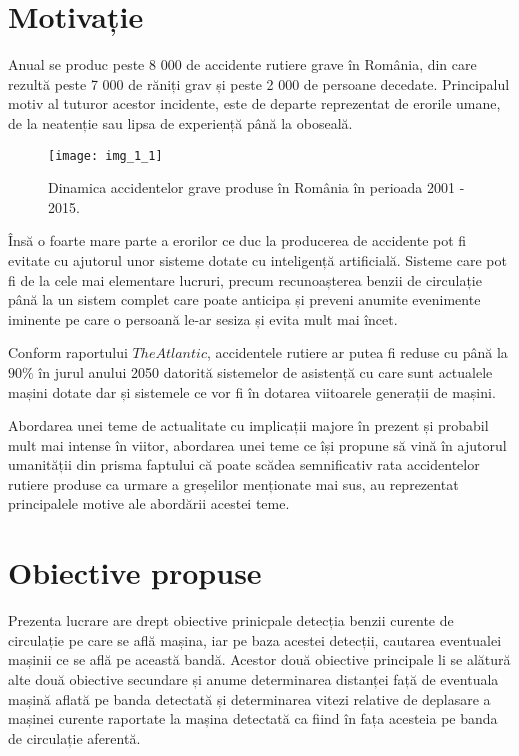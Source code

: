 \section{Motivație}

Anual se produc peste 8 000 de accidente rutiere grave în România, din care rezultă peste 7 000 de răniți grav și peste 2 000 de persoane decedate. Principalul motiv al tuturor acestor incidente, este de departe reprezentat de erorile umane, de la neatenție sau lipsa de experiență până la oboseală.
\begin{figure}[!h]
	\centering
	\texttt{[image: img\_1\_1]}
	\caption{Dinamica accidentelor grave produse în România în perioada 2001 - 2015.}
\end{figure} 

Însă o foarte mare parte a erorilor ce duc la producerea de accidente pot fi evitate cu ajutorul unor sisteme dotate cu inteligență artificială. Sisteme care pot fi de la cele mai elementare lucruri, precum recunoașterea benzii de circulație până la un sistem complet care poate anticipa și preveni anumite evenimente iminente pe care o persoană le-ar sesiza și evita mult mai încet.

Conform raportului $The Atlantic$, accidentele rutiere ar putea fi reduse cu până la $90\%$ în jurul anului 2050 datorită sistemelor de asistență cu care sunt actualele mașini dotate dar și sistemele ce vor fi în dotarea viitoarele generații de mașini.

Abordarea unei teme de actualitate cu implicații majore în prezent și probabil mult mai intense în viitor, abordarea unei teme ce își propune să vină în ajutorul umanității din prisma faptului că poate scădea semnificativ rata accidentelor rutiere produse ca urmare a greșelilor menționate mai sus, au reprezentat principalele motive ale abordării acestei teme.

\section{Obiective propuse}

Prezenta lucrare are drept obiective prinicpale detecția benzii curente de circulație pe care se află mașina, iar pe baza acestei detecții, cautarea eventualei mașinii ce se află pe această bandă. Acestor două obiective principale li se alătură alte două obiective secundare și anume determinarea distanței față de eventuala mașină aflată pe banda detectată și determinarea vitezi relative de deplasare a mașinei curente raportate la mașina detectată ca fiind în fața acesteia pe banda de circulație aferentă.



